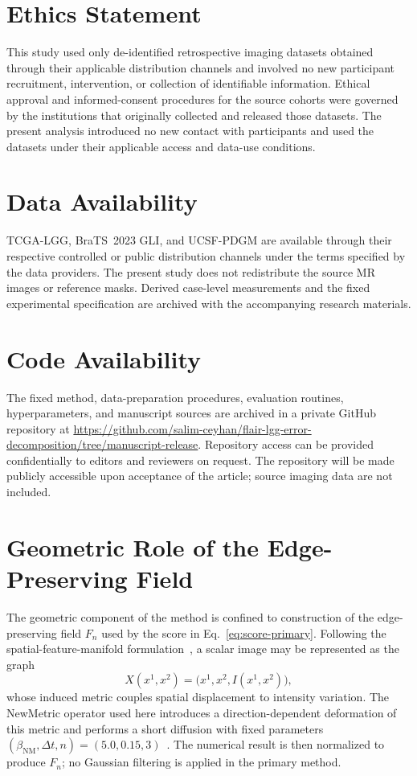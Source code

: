 \documentclass[11pt,a4paper]{article}
\begin{document}
\section*{Ethics Statement}
This study used only de-identified retrospective imaging datasets obtained
through their applicable distribution channels and involved no new participant
recruitment, intervention, or collection
of identifiable information. Ethical approval and informed-consent procedures
for the source cohorts were governed by the institutions that originally
collected and released those datasets. The present analysis introduced no new
contact with participants and used the datasets under their applicable access
and data-use conditions.

\section*{Data Availability}
TCGA-LGG, BraTS~2023 GLI, and UCSF-PDGM are available through their respective
controlled or public distribution channels under the terms specified by the data
providers. The present study does not redistribute the source MR images or
reference masks. Derived case-level measurements and the fixed experimental
specification are archived with the accompanying research materials.

\section*{Code Availability}
The fixed method, data-preparation procedures, evaluation routines,
hyperparameters, and manuscript sources are archived in a private GitHub
repository at \url{https://github.com/salim-ceyhan/flair-lgg-error-decomposition/tree/manuscript-release}.
Repository access can be provided confidentially to editors and reviewers on
request. The repository will be made publicly accessible upon acceptance of the
article; source imaging data are not included.


\appendix

\section{Geometric Role of the Edge-Preserving Field}\label{sec:theory}

The geometric component of the method is confined to construction of the
edge-preserving field $F_n$ used by the score in Eq.~\eqref{eq:score-primary}.
Following the spatial-feature-manifold formulation~\cite{sochen1998}, a scalar
image may be represented as the graph
\begin{equation}
 X(x^1,x^2)=\big(x^1,x^2,I(x^1,x^2)\big),
 \label{eq:immersion}
\end{equation}
whose induced metric couples spatial displacement to intensity variation. The
NewMetric operator used here introduces a direction-dependent deformation of this
metric and performs a short diffusion with fixed parameters
$(\beta_{\mathrm{NM}},\Delta t,n)=(5.0,0.15,3)$~\cite{kilic2022}. The numerical
result is then normalized to produce $F_n$; no Gaussian filtering is applied in
the primary method.
\end{document}
